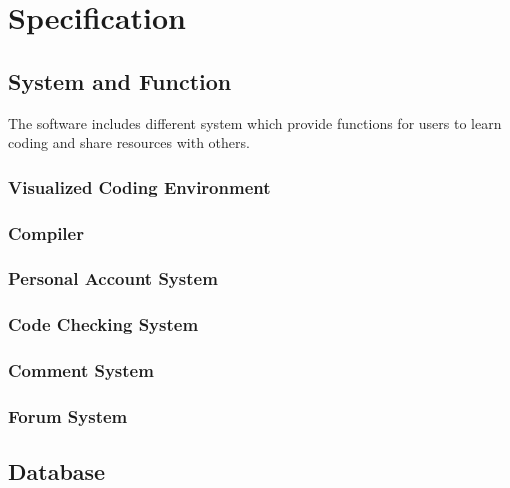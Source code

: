 \chapter{Specification}
\section{System and Function}
The software includes different system which provide functions for users to learn coding and share resources with others.
\subsection{Visualized Coding Environment}
	
\subsection{Compiler}
\subsection{Personal Account System}
	
\subsection{Code Checking System}
	
\subsection{Comment System}
	
\subsection{Forum System}
\section{Database}
